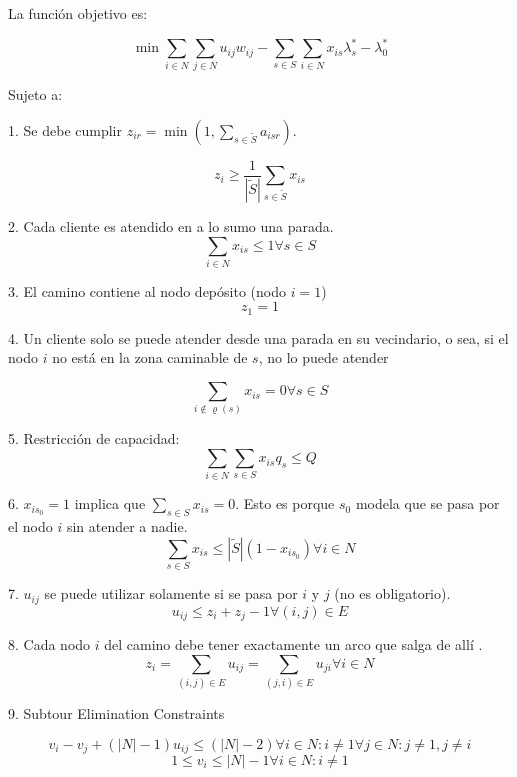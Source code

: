 La función objetivo es:

\[
\min \sum_{i \in N} \sum_{j \in N} {u_{ij} w_{ij}} - \sum_{s \in S} \sum_{i \in N} {x_{is} \lambda^*_s - \lambda^*_0}
\]

Sujeto a:

1. Se debe cumplir $z_{ir} = \min(1, \sum_{s \in \tilde{S}}{a_{isr}})$.

\[
z_i \geq \frac{1}{|\tilde{S}|} \sum_{s \in \tilde{S}} {x_{is}}
\]

2. Cada cliente es atendido en a lo sumo una parada.
\[
\sum_{i \in N} x_{is} \leq 1 
\forall {s \in S}
\]

3. El camino contiene al nodo depósito (nodo $i=1$)
\[
z_1 = 1
\]

4. Un cliente solo se puede atender desde una parada en su vecindario, o sea, si el nodo $i$ no está en la zona caminable de $s$, no lo puede atender

\[
\sum_{i \notin \varrho(s)} x_{is} = 0 \forall s \in S
\]

5. Restricción de capacidad:
\[
\sum_{i \in N} \sum_{s \in S} x_{is} q_s \leq Q
\]

6. $x_{is_0} = 1$ implica que $\sum_{s \in S} x_{is} = 0$. Esto es porque $s_0$ modela que se pasa por el nodo $i$ sin atender a nadie.
\[
\sum_{s \in S} x_{is} \leq |\tilde{S}| (1 - x_{is_0})
\forall i \in N
\]

7. $u_{ij}$ se puede utilizar solamente si se pasa por $i$ y $j$ (no es obligatorio).
\[
u_{ij} \leq z_{i} + z_{j} - 1
\forall {(i, j) \in E}
\]

8. Cada nodo $i$ del camino debe tener exactamente un arco que salga de allí .
\[
z_i = \sum_{(i, j) \in E} u_{ij}  = \sum_{(j, i) \in E} u_{ji} 
\forall {i \in N} 
\]

9. Subtour Elimination Constraints

\[
v_{i} - v_{j} + (|N| - 1)u_{ij} \leq (|N| - 2) 
\forall {i \in N : i \neq 1} \forall {j \in N : j \neq 1, j \neq i} 
\]
\[
1 \leq v_{i} \leq |N| - 1 
\forall {i \in N : i \neq 1} 
\]


